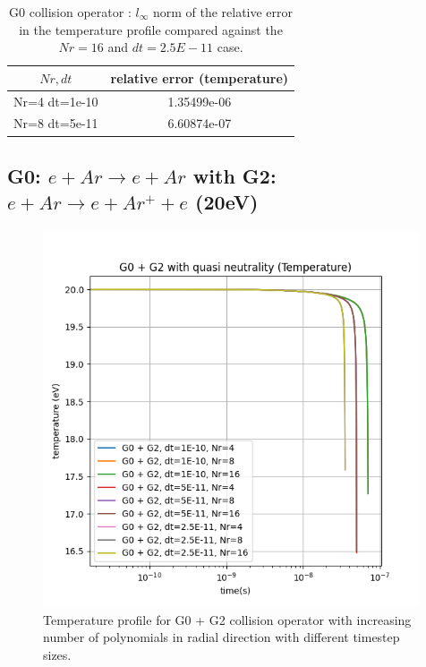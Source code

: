 \documentclass{article}
\begin{document}
\begin{table}[H]
    \centering
    \begin{tabular}{|c|c|}
        \hline
        $Nr,dt$ & relative error (temperature)\\
        \hline
        Nr=4 dt=1e-10      &           1.35499e-06 \\
        Nr=8 dt=5e-11      &           6.60874e-07 \\
        \hline
    \end{tabular}
    \caption{G0 collision operator : $l_\infty$ norm of the relative error in the temperature profile compared against the $Nr=16$ and $dt=2.5E-11$ case. }
\end{table}

\subsection{G0: $e + Ar \rightarrow e + Ar $  with  G2: $e + Ar \rightarrow e + Ar^+ + e $ (20eV)}
\begin{figure}[H]
    \centering
    \includegraphics[width=0.99\textwidth]{dat/g02_temp_profile.png}
    \caption{Temperature profile for G0 + G2 collision operator with increasing number of polynomials in radial direction with different timestep sizes. }
\end{figure}
\end{document}
